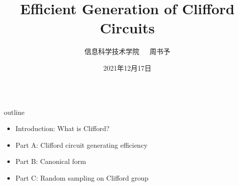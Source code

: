 \documentclass{beamer}
\title{Efficient Generation of Clifford Circuits}
\date{2021年12月17日}
\author{信息科学技术学院\ \ \ 周书予}
\begin{document}
\small
	
	\begin{frame}
	\titlepage
		\begin{center}
		$\ \ \ \ \ \ \ \ $
		\end{center}
	\end{frame}

\begin{frame}{outline}
	\begin{itemize}
		\item Introduction: What is Clifford?
		\item Part A: Clifford circuit generating efficiency
		\item Part B: Canonical form
		\item Part C: Random sampling on Clifford group
	\end{itemize}
\end{frame}
\end{document}

